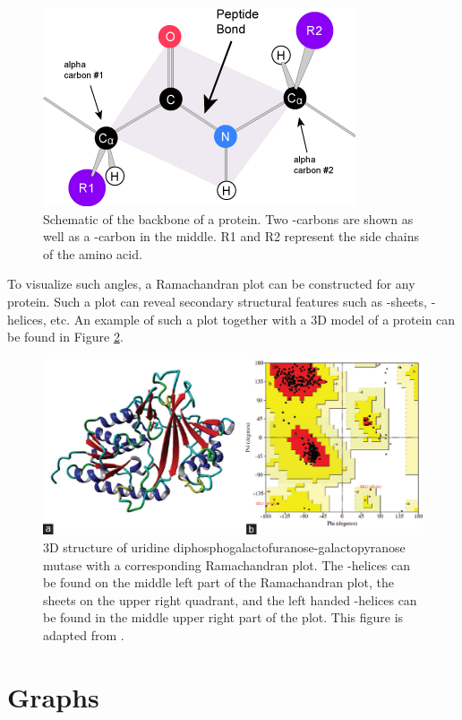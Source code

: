 \begin{figure}[h]
  \centering
  \includegraphics[width=.8\textwidth]{./figures/peptide_bond.png}
  \caption{Schematic of the backbone of a protein. Two \textalpha{}-carbons are
    shown as well as a \textbeta{}-carbon in the middle. R1 and R2 represent the
    side chains of the amino acid. }
  \label{fig:backbone}
\end{figure}


To visualize such angles, a Ramachandran plot can be constructed for any
protein. Such a plot can reveal secondary structural features such as
\textbeta{}-sheets, \textalpha{}-helices, etc. An example of such a plot together
with a 3D model of a protein can be found in Figure \ref{fig:ramachandran}.

\begin{figure}[h]
  \centering
  \includegraphics[width=.7\textwidth]{./figures/ramachandran_plot.jpg}
  \caption{3D structure of uridine diphosphogalactofuranose-galactopyranose
mutase with a corresponding Ramachandran plot. The \textalpha{}-helices can be
found on the middle left part of the Ramachandran plot, the \textbeta{} sheets on
the upper right quadrant, and the left handed \textalpha{}-helices can be found in
the middle upper right part of the plot. This figure is adapted from
\cite{nayak2018identification}.}
  \label{fig:ramachandran}
\end{figure}

\section{Graphs}\label{background:graphs}

